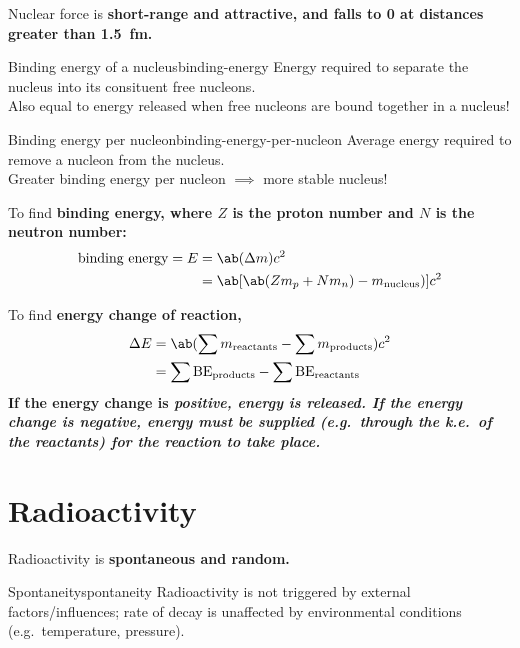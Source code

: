 Nuclear force is \bf{short-range} and \bf{attractive}, and
falls to 0 at distances greater than \qty{1.5}{\femto\meter}.
\begin{definition}{Binding energy of a nucleus}{binding-energy}
	Energy required to separate the nucleus
	into its consituent free nucleons.
	\\
	{\footnotesize Also equal to energy released when free nucleons are bound together in a nucleus!}
\end{definition}

\begin{definition}{Binding energy per nucleon}{binding-energy-per-nucleon}
	Average energy required to remove a nucleon from the nucleus.
	\\
	{\footnotesize Greater binding energy per nucleon \(\implies\) more stable nucleus!}
\end{definition}

To find \bf{binding energy}, where \(Z\) is the proton number and \(N\) is the neutron number:
\begin{align*}
	\text{binding energy} = E & = \ab(\Delta m)c^2                                \\
	                          & = \ab[\ab(Zm_p + Nm_n) - m_{\text{nucleus}})] c^2
\end{align*}

To find \bf{energy change} of reaction,
\begin{align*}
	\Delta E & = \ab(\sum m_{\text{reactants}} - \sum m_{\text{products}}) c^2        \\
	         & = \sum \text{BE}_{\text{products}} - \sum \text{BE}_{\text{reactants}}
\end{align*}
If the energy change is \it{positive}, energy is released.
If the energy change is \it{negative}, energy must be supplied (e.g.~through the k.e.~of the reactants) for the reaction to take place.

\section{Radioactivity}
Radioactivity is \bf{spontaneous} and \bf{random}.
\begin{definition}{Spontaneity}{spontaneity}
	Radioactivity is not triggered by external factors/influences;
	rate of decay is unaffected by environmental conditions (e.g.~temperature, pressure).
\end{definition}

